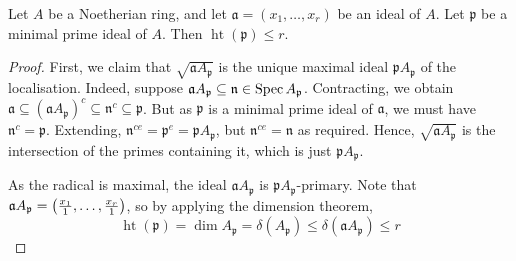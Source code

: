 \begin{corollary}
    Let \( A \) be a Noetherian ring, and let \( \mathfrak a = (x_1, \dots, x_r) \) be an ideal of \( A \).
    Let \( \mathfrak p \) be a minimal prime ideal of \( A \).
    Then \( \operatorname{ht}(\mathfrak p) \leq r \).
\end{corollary}
\begin{proof}
    First, we claim that \( \sqrt{\mathfrak a A_{\mathfrak p}} \) is the unique maximal ideal \( \mathfrak p A_{\mathfrak p} \) of the localisation.
    Indeed, suppose \( \mathfrak a A_{\mathfrak p} \subseteq \mathfrak n \in \operatorname{Spec} A_{\mathfrak p} \).
    Contracting, we obtain \( \mathfrak a \subseteq (\mathfrak a A_{\mathfrak p})^c \subseteq \mathfrak n^c \subseteq \mathfrak p \).
    But as \( \mathfrak p \) is a minimal prime ideal of \( \mathfrak a \), we must have \( \mathfrak n^c = \mathfrak p \).
    Extending, \( \mathfrak n^{ce} = \mathfrak p^e = \mathfrak p A_{\mathfrak p} \), but \( \mathfrak n^{ce} = \mathfrak n \) as required.
    Hence, \( \sqrt{\mathfrak a A_{\mathfrak p}} \) is the intersection of the primes containing it, which is just \( \mathfrak p A_{\mathfrak p} \).

    As the radical is maximal, the ideal \( \mathfrak a A_{\mathfrak p} \) is \( \mathfrak p A_{\mathfrak p} \)-primary.
    Note that \( \mathfrak a A_{\mathfrak p} = \qty(\frac{x_1}{1}, \dots, \frac{x_r}{1}) \), so by applying the dimension theorem,
    \[ \operatorname{ht}(\mathfrak p) = \dim A_{\mathfrak p} = \delta(A_{\mathfrak p}) \leq \delta(\mathfrak a A_{\mathfrak p}) \leq r \]
\end{proof}

